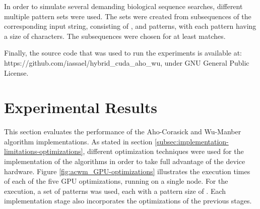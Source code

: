 \documentclass{ws-ijait}
\begin{document}
In order to simulate several demanding biological sequence searches, different multiple pattern sets were used. The sets were created from subsequences of the corresponding input string, consisting of ,  and  patterns, with each pattern having a size of  characters. The subsequences were chosen for at least  matches.

Finally, the source code that was used to run the experiments is available at: https://github.com/iassael/hybrid\_cuda\_aho\_wu, under GNU General Public License.

\section{Experimental Results}
\label{sec:experimental-results}

This section evaluates the performance of the Aho-Corasick and Wu-Manber algorithm implementations. As stated in section \ref{subsec:implementation-limitations-optimizations}, different optimization techniques were used for the implementation of the algorithms in order to take full advantage of the device hardware. Figure \ref{fig:acwm_GPU-optimizations} illustrates the execution times of each of the five GPU optimizations, running on a single node. For the execution, a set of  patterns was used, each with a pattern size of . Each implementation stage also incorporates the optimizations of the previous stages.
\end{document}
